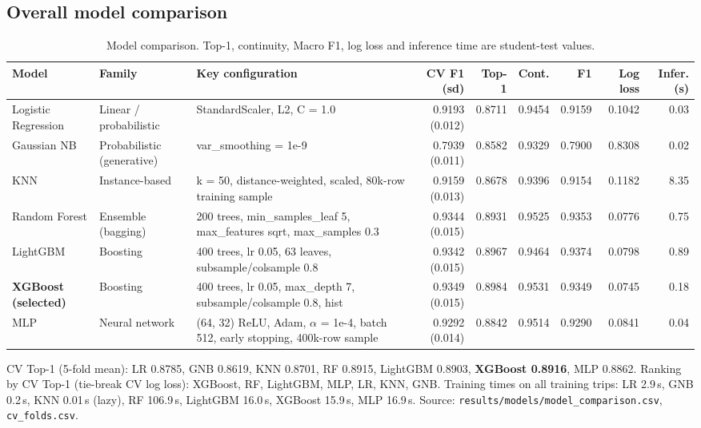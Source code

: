 \documentclass[10pt,a4paper]{article}
\newcommand{\code}[1]{\texttt{\small #1}}
\newcommand{\note}[1]{{\noindent\small\color{black!65}#1\par}}
\begin{document}
\subsection{Overall model comparison}
\begin{table}[H]\centering\scriptsize
\caption{Model comparison. Top-1, continuity, Macro F1, log loss and inference time are student-test values.}
\setlength{\tabcolsep}{3pt}
\begin{tabularx}{\textwidth}{>{\raggedright\arraybackslash}p{1.9cm}>{\raggedright\arraybackslash}p{1.7cm}Lrrrrrr}
\toprule
Model & Family & Key configuration & CV F1 (sd) & Top-1 & Cont. & F1 & Log loss & Infer. (s)\\
\midrule
Logistic Regression & Linear / probabilistic & StandardScaler, L2, C = 1.0 & 0.9193 (0.012) & 0.8711 & 0.9454 & 0.9159 & 0.1042 & 0.03\\
Gaussian NB & Probabilistic (generative) & var\_smoothing = 1e-9 & 0.7939 (0.011) & 0.8582 & 0.9329 & 0.7900 & 0.8308 & 0.02\\
KNN & Instance-based & k = 50, distance-weighted, scaled, 80k-row training sample & 0.9159 (0.013) & 0.8678 & 0.9396 & 0.9154 & 0.1182 & 8.35\\
Random Forest & Ensemble (bagging) & 200 trees, min\_samples\_leaf 5, max\_features sqrt, max\_samples 0.3 & 0.9344 (0.015) & 0.8931 & 0.9525 & 0.9353 & 0.0776 & 0.75\\
LightGBM & Boosting & 400 trees, lr 0.05, 63 leaves, subsample/colsample 0.8 & 0.9342 (0.015) & 0.8967 & 0.9464 & 0.9374 & 0.0798 & 0.89\\
\textbf{XGBoost (selected)} & Boosting & 400 trees, lr 0.05, max\_depth 7, subsample/colsample 0.8, hist & 0.9349 (0.015) & 0.8984 & 0.9531 & 0.9349 & 0.0745 & 0.18\\
MLP & Neural network & (64, 32) ReLU, Adam, $\alpha$ = 1e-4, batch 512, early stopping, 400k-row sample & 0.9292 (0.014) & 0.8842 & 0.9514 & 0.9290 & 0.0841 & 0.04\\
\bottomrule
\end{tabularx}
\end{table}
\note{CV Top-1 (5-fold mean): LR 0.8785, GNB 0.8619, KNN 0.8701, RF 0.8915, LightGBM 0.8903, \textbf{XGBoost 0.8916}, MLP 0.8862. Ranking by CV Top-1 (tie-break CV log loss): XGBoost, RF, LightGBM, MLP, LR, KNN, GNB. Training times on all training trips: LR 2.9\,s, GNB 0.2\,s, KNN 0.01\,s (lazy), RF 106.9\,s, LightGBM 16.0\,s, XGBoost 15.9\,s, MLP 16.9\,s. Source: \code{results/models/model\_comparison.csv}, \code{cv\_folds.csv}.}
\end{document}
